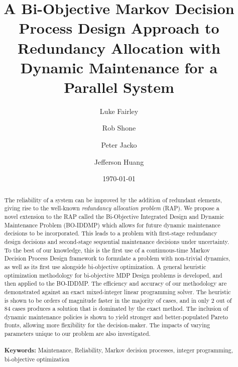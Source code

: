 \documentclass[11pt,authoryear,a4paper]{article}
\theoremstyle{definition}
\begin{document}
\title{A Bi-Objective Markov Decision Process Design Approach to Redundancy Allocation with Dynamic Maintenance for a Parallel System}

\author[1]{Luke Fairley}
\author[1]{Rob Shone}
\author[1,2]{Peter Jacko}
\author[3]{Jefferson Huang}
\date{\today} %

\maketitle

\begin{abstract}
    The reliability of a system can be improved by the addition of redundant elements, giving rise to the well-known \emph{redundancy allocation problem} (RAP). We propose a novel extension to the RAP called the Bi-Objective Integrated Design and Dynamic Maintenance Problem (BO-IDDMP) which allows for future dynamic maintenance decisions to be incorporated. This leads to a problem with first-stage redundancy design decisions and second-stage sequential maintenance decisions under uncertainty. To the best of our knowledge, this is the first use of a continuous-time Markov Decision Process Design framework to formulate a problem with non-trivial dynamics, as well as its first use alongside bi-objective optimization. A general heuristic optimization methodology for bi-objective MDP Design problems is developed, and then applied to the BO-IDDMP. The efficiency and accuracy of our methodology are demonstrated against an exact mixed-integer linear programming solver. The heuristic is shown to be orders of magnitude faster in the majority of cases, and in only 2 out of 84 cases produces a solution that is dominated by the exact method. The inclusion of dynamic maintenance policies is shown to yield stronger and better-populated Pareto fronts, allowing more flexibility for the decision-maker. The impacts of varying parameters unique to our problem are also investigated.
\\ \ \\
    \textbf{Keywords:} Maintenance, Reliability, Markov decision processes, integer programming, bi-objective optimization\\
\end{abstract}
\end{document}
